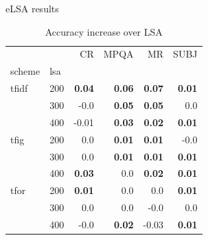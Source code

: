 \documentclass[xcolor={table}]{beamer}
\begin{document}
\begin{frame}{eLSA results}
    \smalll
\begin{table}[H]
\begin{center}

\begin{tabular}{ll|rrrr}
\toprule
   &   &   CR &  MPQA &   MR &  SUBJ \\
scheme & lsa &        &        &        &        \\
\midrule
tfidf & 200 & \textbf{0.04} & \textbf{0.06} & \textbf{0.07} & \textbf{0.01} \\
   & 300 &     -0.0 & \textbf{0.05} & \textbf{0.05} &      0.0 \\
   & 400 &     -0.01 & \textbf{0.03} & \textbf{0.02} & \textbf{0.01} \\
tfig & 200 &      0.0 & \textbf{0.01} & \textbf{0.01} &     -0.0 \\
   & 300 &      0.0 & \textbf{0.01} & \textbf{0.01} & \textbf{0.01} \\
   & 400 & \textbf{0.03} &      0.0 & \textbf{0.02} & \textbf{0.01} \\
tfor & 200 & \textbf{0.01} &      0.0 &      0.0 & \textbf{0.01} \\
   & 300 &      0.0 &      0.0 &     -0.0 &      0.0 \\
   & 400 &     -0.0 & \textbf{0.02} &     -0.03 & \textbf{0.01} \\
\bottomrule
\end{tabular}

\caption[Accuracy increase over LSA]{Accuracy increase over LSA}
\label{tab:batch:results}
\end{center}
\end{table}
\end{frame}
\end{document}
